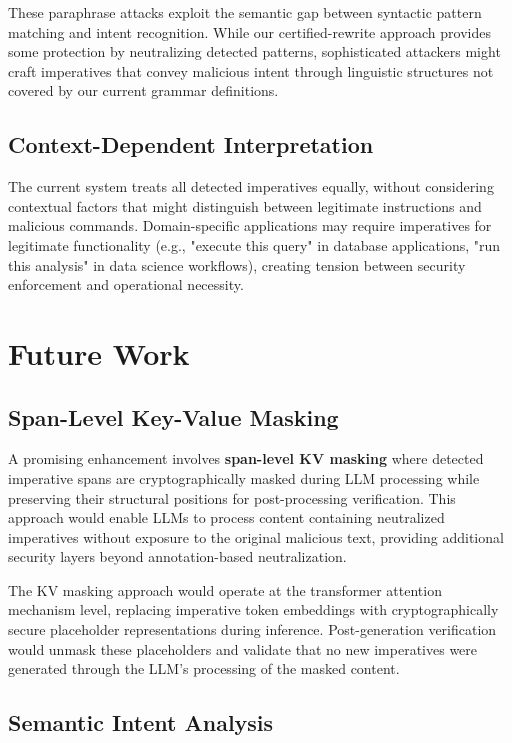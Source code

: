 These paraphrase attacks exploit the semantic gap between syntactic pattern matching and intent recognition. While our certified-rewrite approach provides some protection by neutralizing detected patterns, sophisticated attackers might craft imperatives that convey malicious intent through linguistic structures not covered by our current grammar definitions.

\subsection{Context-Dependent Interpretation}

The current system treats all detected imperatives equally, without considering contextual factors that might distinguish between legitimate instructions and malicious commands. Domain-specific applications may require imperatives for legitimate functionality (e.g., "execute this query" in database applications, "run this analysis" in data science workflows), creating tension between security enforcement and operational necessity.

\section{Future Work}

\subsection{Span-Level Key-Value Masking}

A promising enhancement involves \textbf{span-level KV masking} where detected imperative spans are cryptographically masked during LLM processing while preserving their structural positions for post-processing verification. This approach would enable LLMs to process content containing neutralized imperatives without exposure to the original malicious text, providing additional security layers beyond annotation-based neutralization.

The KV masking approach would operate at the transformer attention mechanism level, replacing imperative token embeddings with cryptographically secure placeholder representations during inference. Post-generation verification would unmask these placeholders and validate that no new imperatives were generated through the LLM's processing of the masked content.

\subsection{Semantic Intent Analysis}

